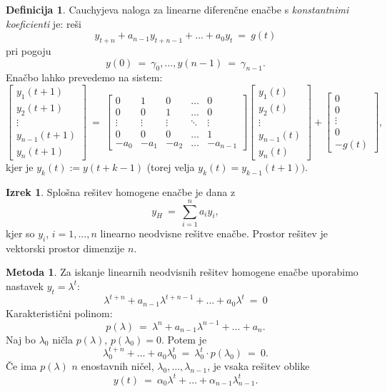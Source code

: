 \documentclass[11pt]{article}
\newcommand{\0}{\mathbf{0}}
\theoremstyle{definition}
\newtheorem{definicija}{Definicija}[section]
\theoremstyle{definition}
\theoremstyle{definition}
\newtheorem{izrek}{Izrek}[section]
\theoremstyle{definition}
\newtheorem{metoda}{Metoda}[section]
\begin{document}
\begin{definicija}

Cauchyjeva naloga za linearne diferenčne enačbe s \textit{konstantnimi koeficienti} je: reši
$$y_{t+n} + a_{n-1}y_{t+n-1} + \ldots + a_0y_t ~=~ g(t)$$
pri pogoju
$$y(0) ~=~ \gamma_0,\ldots,y(n-1) ~=~ \gamma_{n-1}.$$
Enačbo lahko prevedemo na sistem:
$$\begin{bmatrix}
y_1(t+1) \\
y_2(t+1) \\
\vdots \\
y_{n-1}(t+1) \\
y_{n}(t+1)
\end{bmatrix} ~=~ \begin{bmatrix}
0 & 1 & 0 & \ldots & 0 \\
0 & 0 & 1 & \ldots & 0 \\
\vdots & \vdots & \vdots & \ddots & \vdots \\
0 & 0 & 0 & \ldots & 1 \\
-a_0 & -a_1 & -a_2 & \ldots & -a_{n-1} 
\end{bmatrix} \begin{bmatrix}
y_1(t) \\
y_2(t) \\
\vdots \\
y_{n-1}(t) \\
y_n(t)
\end{bmatrix} + \begin{bmatrix}
0 \\
0 \\
\vdots \\
0 \\
-g(t)
\end{bmatrix},$$
kjer je $y_k(t) := y(t+k-1)$ (torej velja $y_k(t) = y_{k-1}(t+1))$.

\end{definicija}
\vspace{0.5cm}

\begin{izrek}

Splošna rešitev homogene enačbe je dana z
$$y_H ~=~ \sum_{i=1}^n a_i y_i,$$
kjer so $y_i$, $i=1,\ldots,n$ linearno neodvisne rešitve enačbe. Prostor rešitev je vektorski prostor dimenzije $n.$

\end{izrek}
\vspace{0.5cm}

\begin{metoda}

Za iskanje linearnih neodvisnih rešitev homogene enačbe uporabimo nastavek $y_t = \lambda^t$:
$$\lambda^{t+n} + a_{n-1}\lambda^{t+n-1} + \ldots + a_0\lambda^t ~=~ 0$$
Karakteristični polinom:
$$p(\lambda) ~=~ \lambda^n + a_{n-1}\lambda^{n-1} + \ldots + a_n.$$
Naj bo $\lambda_0$ ničla $p(\lambda)$, $p(\lambda_0) = 0$. Potem je
$$\lambda_0^{t+n} + \ldots + a_0\lambda_0^t ~=~ \lambda_0^t \cdot p(\lambda_0) ~=~ 0.$$
Če ima $p(\lambda)$ $n$ enostavnih ničel, $\lambda_0,\ldots,\lambda_{n-1}$, je vsaka rešitev oblike
$$y(t) ~=~ \alpha_0\lambda^t + \ldots + \alpha_{n-1}\lambda_{n-1}^t.$$

\end{metoda}
\vspace{0.5cm}
\end{document}
